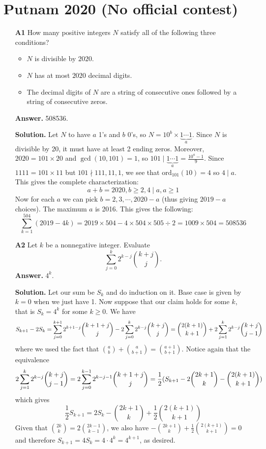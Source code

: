 \documentclass[11pt,a4paper]{article}
\newcommand{\<}{\langle}
\renewcommand{\>}{\rangle}
\newcommand{\ord}{\mathrm{ord}}
\begin{document}
\newcommand{\sgn}{\text{sgn}}
\setcounter{secnumdepth}{0}

\section{Putnam 2020 (No official contest)}
\begin{enumerate}
	\item [\textbf{A1}] 
	How many positive integers $N$ satisfy all of the following three conditions?
	\begin{itemize}
		\item $N$ is divisible by $2020$.
		\item $N$ has at most $2020$ decimal digits.
		\item The decimal digits of $N$ are a string of consecutive ones followed by a string of consecutive zeros.
	\end{itemize}

    \textbf{Answer.} 508536. 
    
    \textbf{Solution.} 
    Let $N$ to have $a$ 1's and $b$ 0's, so $N=10^b\times \underbrace{1\cdots 1}_{a}$. 
    Since $N$ is divisible by 20, it must have at least 2 ending zeros. 
    Moreover, $2020=101\times 20$ and $\gcd(10, 101)=1$, so $101\mid \underbrace{1\cdots 1}_{a}=\frac{10^a-1}{9}$. 
    Since $1111=101\times 11$ but $101\nmid 111, 11, 1$, we see that $\ord_{101}(10)=4$ so 
    $4\mid a$. 
    This gives the complete characterization: 
    \[
    a+b=2020, b\ge 2, 4\mid a, a\ge 1
    \]
    Now for each $a$ we can pick $b=2, 3, \cdots, 2020-a$ (thus giving $2019-a$ choices). The maximum $a$ is 2016. 
    This gives the following: 
    \[
    \sum_{k=1}^{504} (2019-4k)
    =2019\times 504 - 4\times 504\times 505\div 2
    =1009\times 504
    =508536
    \]
    
    \item [\textbf{A2}] 
    Let $k$ be a nonnegative integer. Evaluate
    \[ \sum_{j=0}^k 2^{k-j} \binom{k+j}{j}. \]
    \textbf{Answer.} $4^k$. 
    
    \textbf{Solution.} Let our sum be $S_k$ and do induction on it. Base case is given by $k=0$ when we just have 1. 
    Now suppose that our claim holds for some $k$, that is $S_k=4^k$ for some $k\ge 0$. We have 
    \[
    S_{k+1}-2S_k = \sum_{j=0}^{k+1} 2^{k+1-j} \binom{k+1+j}{j}-2\sum_{j=0}^k 2^{k-j} \binom{k+j}{j}
    =\binom{2(k+1)}{k+1}+2\sum_{j=1}^k 2^{k-j}\dbinom{k+j}{j-1}
    \]
    where we used the fact that $\binom{a}{b}+\binom{a}{b+1}=\binom{a+1}{b+1}$. 
    Notice again that the equivalence
    \[
    2\sum_{j=1}^k 2^{k-j}\dbinom{k+j}{j-1}
    =2\sum_{j=0}^{k-1} 2^{k-j-1}\dbinom{k+1+j}{j}
    =\frac12(S_{k+1} - 2\binom{2k+1}{k}-\binom{2(k+1)}{k+1})
    \]
    which gives 
    \[
    \frac 12 S_{k+1} = 2S_k - \binom{2k+1}{k} + \frac 12 \binom{2(k+1)}{k+1}
    \]
    Given that $\binom{2k}{k}=2\binom{2k-1}{k-1}$, we also have $-\binom{2k+1}{k} + \frac 12 \binom{2(k+1)}{k+1}=0$ and therefore $S_{k+1}=4S_k=4\cdot 4^k=4^{k+1}$, as desired. 
    

\end{enumerate}
\end{document}
